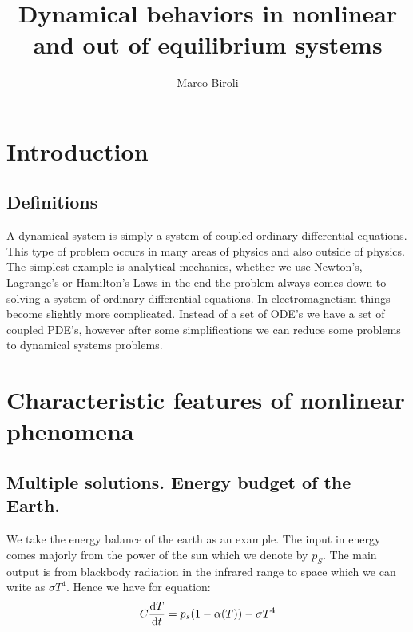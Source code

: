 \documentclass[10pt,a4paper]{book}
\author{Marco Biroli}
\title{Dynamical behaviors in nonlinear and out of equilibrium systems}
\begin{document}
\maketitle
\tableofcontents

\chapter{Introduction}
\section{Definitions}
A dynamical system is simply a system of coupled ordinary differential equations. This type of problem occurs in many areas of physics and also outside of physics. The simplest example is analytical mechanics, whether we use Newton's, Lagrange's or Hamilton's Laws in the end the problem always comes down to solving a system of ordinary differential equations. In electromagnetism things become slightly more complicated. Instead of a set of ODE's we have a set of coupled PDE's, however after some simplifications we can reduce some problems to dynamical systems problems. 

\chapter{Characteristic features of nonlinear phenomena}
\section{Multiple solutions. Energy budget of the Earth.}
We take the energy balance of the earth as an example. The input in energy comes majorly from the power of the sun which we denote by $p_S$. The main output is from blackbody radiation in the infrared range to space which we can write as $\sigma T^4$. Hence we have for equation:
\[
C \dv{T}{t} = p_s(1 - \alpha(T)) - \sigma T^4
\]
\end{document}
